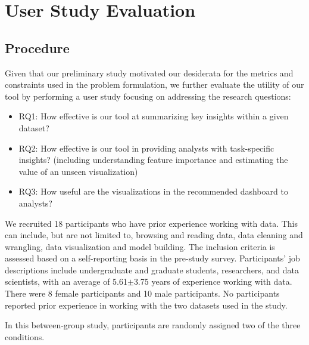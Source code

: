 \section{User Study Evaluation}
\subsection{Procedure}
Given that our preliminary study motivated our desiderata for the metrics and constraints used in the problem formulation, we further evaluate the utility of our tool by performing a user study focusing on addressing the research questions: 
\begin{itemize}
	\item RQ1: How effective is our tool at summarizing key insights within a given dataset?
	\item RQ2: How effective is our tool in providing analysts with task-specific insights? (including understanding feature importance and estimating the value of an unseen visualization) 
	\item RQ3: How useful are the visualizations in the recommended dashboard to analysts?
\end{itemize}
We recruited 18 participants who have prior experience working with data. This can include, but are not limited to, browsing and reading data, data cleaning and wrangling, data visualization and model building. The inclusion criteria is assessed based on a self-reporting basis in the pre-study survey. Participants' job descriptions include undergraduate and graduate students, researchers, and data scientists, with an average of 5.61$\pm$3.75 years of experience working with data. There were 8 female participants and 10 male participants. No participants reported prior experience in working with the two datasets used in the study.
\par In this between-group study, participants are randomly assigned two of the three conditions. 
